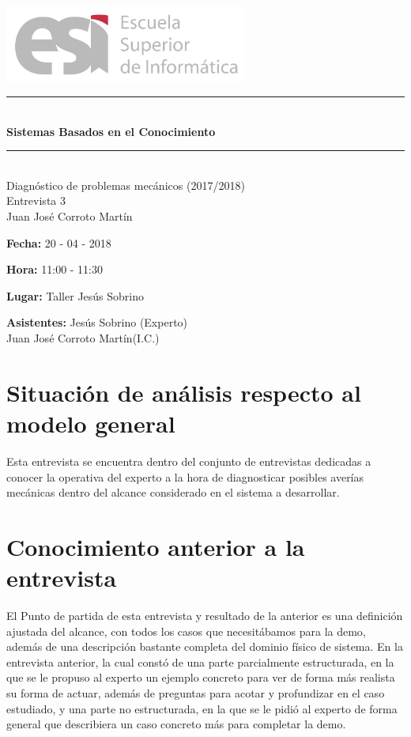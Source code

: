 \documentclass[a4paper,12pt]{article}
\newcommand\tab[1][1cm]{\hspace*{#1}}
\begin{document}
\begin{titlepage}
\begin{center}

\includegraphics[width=0.6\textwidth]{logoesi}\\[5cm]

\rule{\linewidth}{0.5mm} \\[0.4cm]
{ \huge \bfseries Sistemas Basados en el Conocimiento\\[0.4cm] }
\rule{\linewidth}{0.5mm} \\[1.5cm]
{\huge Diagnóstico de problemas mecánicos (2017/2018)\\Entrevista 3}\\[0.5cm]

\large{Juan Jos\'e Corroto Mart\'in}

\end{center}
\end{titlepage}

\tableofcontents
\newpage

\textbf{Fecha:} 20 - 04 - 2018 

\textbf{Hora: } 11:00 - 11:30

\textbf{Lugar:} Taller Jesús Sobrino

\textbf{Asistentes:} Jesús Sobrino  (Experto)\\ \tab \tab \tab Juan José Corroto Martín(I.C.) 

\section{Situación de análisis respecto al modelo general}
 Esta entrevista se encuentra dentro del conjunto de entrevistas dedicadas a conocer la operativa del experto a la hora de diagnosticar posibles averías mecánicas dentro del alcance considerado en el sistema a desarrollar. 
 
\section{Conocimiento anterior a la entrevista}
El Punto de partida de esta entrevista y resultado de la anterior es una definición ajustada del alcance, con todos los casos que necesitábamos para la demo, además de una descripción bastante completa del dominio físico de sistema. En la entrevista anterior, la cual constó de una parte parcialmente estructurada, en la que se le propuso al experto un ejemplo concreto para ver de forma más realista su forma de actuar, además de preguntas para acotar y profundizar en el caso estudiado, y una parte no estructurada, en la que se le pidió al experto de forma general que describiera un caso concreto más para completar la demo.
\end{document}
